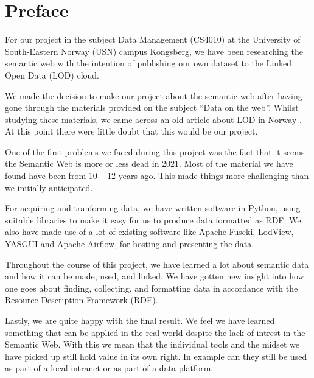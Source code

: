 \chapter*{Preface}

For our project in the subject Data Management (CS4010) at the University of South-Eastern Norway (USN) campus Kongsberg, we have been researching the semantic web with the intention of publishing our own dataset to the Linked Open Data (LOD) cloud.

\vspace{5mm}


We made the decision to make our project about the semantic web after having gone through the materials provided on the subject “Data on the web”. Whilst studying these materials, we came across an old article about LOD in Norway \cite{semicolon_slutt}. At this point there were little doubt that this would be our project.

\vspace{5mm}

One of the first problems we faced during this project was the fact that it seems the Semantic Web is more or less dead in 2021. Most of the material we have found have been from 10 – 12 years ago. This made things more challenging than we initially anticipated. 

\vspace{5mm}

For acquiring and tranforming data, we have written software in Python, using suitable libraries to make it easy for us to produce data formatted as RDF. We also have made use of a lot of existing software like Apache Fuseki, LodView, YASGUI and Apache Airflow, for hosting and presenting the data.

\vspace{5mm}

Throughout the course of this project, we have learned a lot about semantic data and how it can be made, used, and linked. We have gotten new insight into how one goes about finding, collecting, and formatting data in accordance with the  Resource Description Framework (RDF).

\vspace{5mm}

Lastly, we are quite happy with the final result. We feel we have learned something that can be applied in the real world despite the lack of intrest in the Semantic Web. With this we mean that the individual tools and the midset we have picked up still hold value in its own right. In example can they still be used as part of a local intranet or as part of a data platform.




